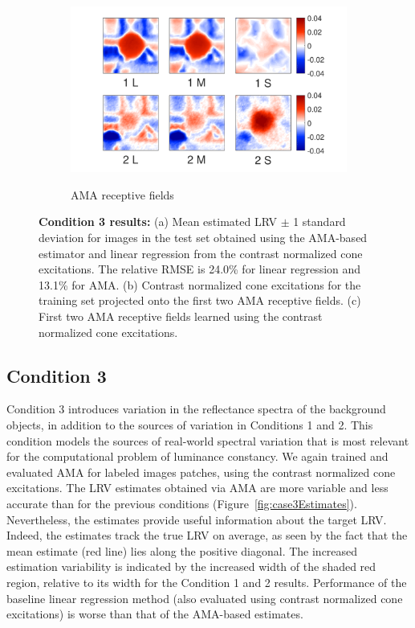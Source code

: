 \documentclass{jov}
\begin{document}
\begin{figure}
\begin{subfigure}[b]{0.26\textwidth}
        \label{fig:case3RFResponse}
    \end{subfigure}
    \begin{subfigure}[b]{0.4 \textwidth}
	\caption{AMA receptive fields}
	\includegraphics[width=1.0\textwidth, trim={0.2cm -0.cm 0 0.3cm}]{../FiguresDraft5/Figure12/Figure12_c.pdf}
	\label{fig:case3RFs}
    \end{subfigure}
    \caption{{\bf Condition 3 results:} (a) Mean estimated LRV $\pm$ 1 standard deviation for images in the test set obtained using the AMA-based estimator and linear regression from the contrast normalized cone excitations. The relative RMSE is 24.0\%  for linear regression and 13.1\% for AMA. (b) Contrast normalized cone excitations for the training set projected onto the first two AMA receptive fields. (c) First two AMA receptive fields learned using the contrast normalized cone excitations.}
\label{fig:Condition3}
\end{figure}

\subsection{Condition 3}

Condition 3 introduces variation in the reflectance spectra of the background objects, in addition to the sources of variation in Conditions 1 and 2.
This condition models the sources of real-world spectral variation that is most relevant for the computational problem of luminance constancy.
We again trained and evaluated AMA for labeled images patches, using the contrast normalized cone excitations.
The LRV estimates obtained via AMA are more variable and less accurate than for the previous conditions (Figure~\ref{fig:case3Estimates}).
Nevertheless, the estimates provide useful information about the target LRV.
Indeed, the estimates track the true LRV on average, as seen by the fact that the mean estimate (red line) lies along the positive diagonal.
The increased estimation variability is indicated by the increased width of the shaded red region, relative to its width for the Condition 1 and 2 results.
Performance of the baseline linear regression method (also evaluated using contrast normalized cone excitations) is worse than that of the AMA-based estimates.
\end{document}
